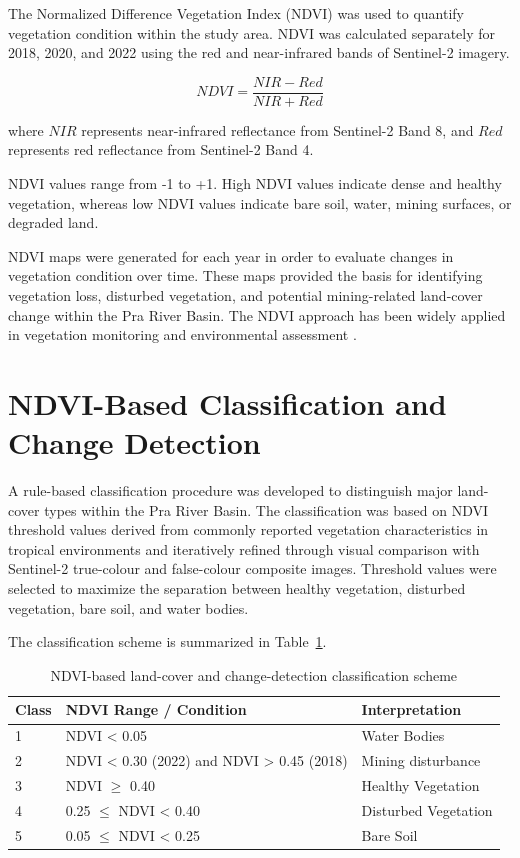 \documentclass[a4paper,12pt]{report}
\begin{document}
The Normalized Difference Vegetation Index (NDVI) was used to quantify vegetation condition within the study area. NDVI was calculated separately for 2018, 2020, and 2022 using the red and near-infrared bands of Sentinel-2 imagery.

\begin{equation}
NDVI = \frac{NIR - Red}{NIR + Red}
\end{equation}

where $NIR$ represents near-infrared reflectance from Sentinel-2 Band 8, and $Red$ represents red reflectance from Sentinel-2 Band 4.

NDVI values range from -1 to +1. High NDVI values indicate dense and healthy vegetation, whereas low NDVI values indicate bare soil, water, mining surfaces, or degraded land.

NDVI maps were generated for each year in order to evaluate changes in vegetation condition over time. These maps provided the basis for identifying vegetation loss, disturbed vegetation, and potential mining-related land-cover change within the Pra River Basin.
The NDVI approach has been widely applied in vegetation monitoring and environmental assessment \citep{tucker1979ndvi}.


\section{NDVI-Based Classification and Change Detection}

A rule-based classification procedure was developed to distinguish major land-cover types within the Pra River Basin. The classification was based on NDVI threshold values derived from commonly reported vegetation characteristics in tropical environments and iteratively refined through visual comparison with Sentinel-2 true-colour and false-colour composite images. Threshold values were selected to maximize the separation between healthy vegetation, disturbed vegetation, bare soil, and water bodies.

The classification scheme is summarized in Table~\ref{tab:ndvi_classes}.

\begin{table}[H]
\centering
\caption{NDVI-based land-cover and change-detection classification scheme}
\label{tab:ndvi_classes}

\begin{tabular}{lll}
\toprule
Class & NDVI Range / Condition & Interpretation \\
\midrule
1 & NDVI < 0.05 & Water Bodies \\
2 & NDVI < 0.30 (2022) and NDVI > 0.45 (2018) & Mining disturbance \\
3 & NDVI $\geq$ 0.40 & Healthy Vegetation \\
4 & 0.25 $\leq$ NDVI < 0.40 & Disturbed Vegetation \\
5 & 0.05 $\leq$ NDVI < 0.25 & Bare Soil \\
\bottomrule
\end{tabular}

\end{table}
\end{document}
